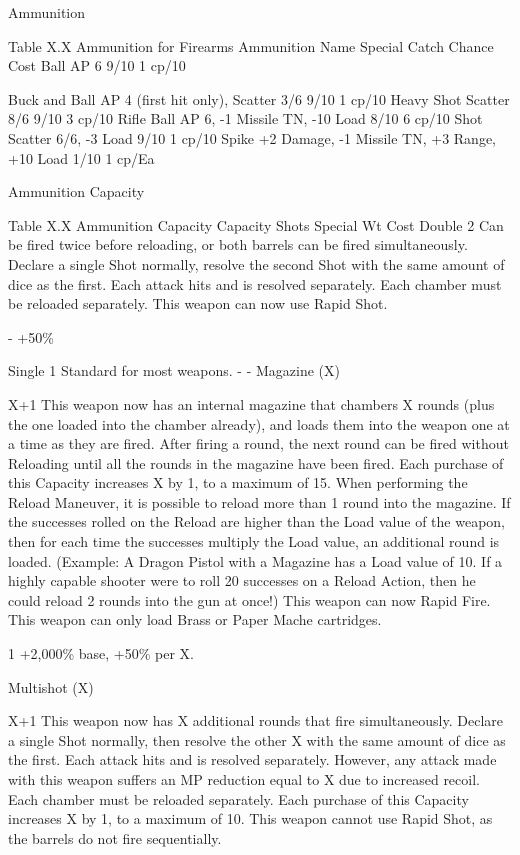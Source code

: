 \documentclass[oneside,11pt,english]{book}
\begin{document}
 

Ammunition 

 
Table X.X Ammunition for Firearms 
Ammunition Name Special Catch Chance Cost 
Ball AP 6 9/10 1 cp/10 


Buck and Ball AP 4 (first hit only), Scatter 3/6 9/10 1 cp/10 
Heavy Shot Scatter 8/6 9/10 3 cp/10 
Rifle Ball AP 6, -1 Missile TN, -10 Load 8/10 6 cp/10 
Shot Scatter 6/6, -3 Load 9/10 1 cp/10 
Spike +2 Damage, -1 Missile TN, +3 Range, +10 Load 1/10 1 cp/Ea 

 
Ammunition Capacity 

 
Table X.X Ammunition Capacity 
Capacity Shots Special Wt Cost 
Double 2 Can be fired twice before reloading, or both barrels can be fired simultaneously. 
Declare a single Shot normally, resolve the second Shot with the same amount of 
dice as the first. Each attack hits and is resolved separately. Each chamber must be 
reloaded separately. 
This weapon can now use Rapid Shot. 

- +50\% 

Single 1 Standard for most weapons. - - 
Magazine 
(X) 

X+1 This weapon now has an internal magazine that chambers X rounds (plus the one 
loaded into the chamber already), and loads them into the weapon one at a time as 
they are fired. 
After firing a round, the next round can be fired without Reloading until all the 
rounds in the magazine have been fired. Each purchase of this Capacity increases X 
by 1, to a maximum of 15. 
When performing the Reload Maneuver, it is possible to reload more than 1 round 
into the magazine. If the successes rolled on the Reload are higher than the Load 
value of the weapon, then for each time the successes multiply the Load value, an 
additional round is loaded. (Example: A Dragon Pistol with a Magazine has a Load 
value of 10. If a highly capable shooter were to roll 20 successes on a Reload 
Action, then he could reload 2 rounds into the gun at once!) 
This weapon can now Rapid Fire. 
This weapon can only load Brass or Paper Mache cartridges. 

 

1 +2,000\% 
base, +50\% 
per X. 

Multishot 
(X) 

X+1 This weapon now has X additional rounds that fire simultaneously. Declare a single 
Shot normally, then resolve the other X with the same amount of dice as the first. 
Each attack hits and is resolved separately. However, any attack made with this 
weapon suffers an MP reduction equal to X due to increased recoil. Each chamber 
must be reloaded separately. Each purchase of this Capacity increases X by 1, to a 
maximum of 10. 
This weapon cannot use Rapid Shot, as the barrels do not fire sequentially. 
\end{document}

